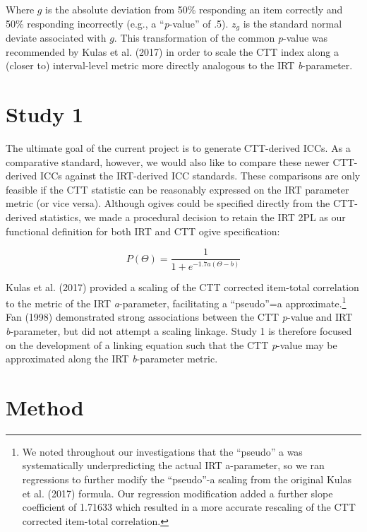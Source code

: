 \documentclass[
  jou]{apa6}
\begin{document}
Where \(g\) is the absolute deviation from 50\% responding an item correctly and 50\% responding incorrectly (e.g., a ``\emph{p}-value'' of .5). \(z_g\) is the standard normal deviate associated with \(g\). This transformation of the common \emph{p}-value was recommended by Kulas et al. (2017) in order to scale the CTT index along a (closer to) interval-level metric more directly analogous to the IRT \emph{b}-parameter.

\hypertarget{study-1}{%
\section{Study 1}\label{study-1}}

The ultimate goal of the current project is to generate CTT-derived ICCs. As a comparative standard, however, we would also like to compare these newer CTT-derived ICCs against the IRT-derived ICC standards. These comparisons are only feasible if the CTT statistic can be reasonably expressed on the IRT parameter metric (or vice versa). Although ogives could be specified directly from the CTT-derived statistics, we made a procedural decision to retain the IRT 2PL as our functional definition for both IRT and CTT ogive specification:

\begin{equation}
P(\Theta)=\frac{1}{1+e^{-1.7a(\Theta-b)}}
\end{equation}

Kulas et al. (2017) provided a scaling of the CTT corrected item-total correlation to the metric of the IRT \emph{a}-parameter, facilitating a ``pseudo''=a approximate.\footnote{We noted throughout our investigations that the ``pseudo'' a was systematically underpredicting the actual IRT a-parameter, so we ran regressions to further modify the ``pseudo''-a scaling from the original Kulas et al. (2017) formula. Our regression modification added a further slope coefficient of 1.71633 which resulted in a more accurate rescaling of the CTT corrected item-total correlation.} Fan (1998) demonstrated strong associations between the CTT \emph{p}-value and IRT \emph{b}-parameter, but did not attempt a scaling linkage. Study 1 is therefore focused on the development of a linking equation such that the CTT \emph{p}-value may be approximated along the IRT \emph{b}-parameter metric.

\hypertarget{method}{%
\section{Method}\label{method}}
\end{document}
